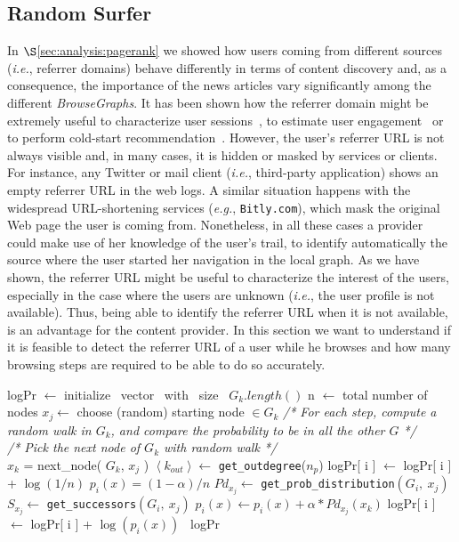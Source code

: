\documentclass{sig-alternate-2013}
\newcommand{\ie}{\emph{i.e.}}
\newcommand{\eg}{\emph{e.g.}}
\newcommand{\bgraphs}{\textit{BrowseGraphs}}
\begin{document}
\subsection{Random Surfer} \label{sec:randomsurfer}
In $\S$\ref{sec:analysis:pagerank} we showed how users coming from different sources (\ie, referrer domains) behave differently in terms of content discovery and, as a consequence, the importance of the news articles vary significantly among the different \bgraphs.
It has been shown how the referrer domain might be extremely useful to characterize user sessions~\cite{chiarandini12discovering}, to estimate user engagement~\cite{lehmann2013measuring} or to perform cold-start recommendation~\cite{TrevisiolRecSys14}.
However, the user's referrer URL is not always visible and, in many cases, it is hidden or masked by services or clients. For instance, any Twitter or mail client (\ie, third-party application) shows an empty referrer URL in the web logs. A similar situation happens with the widespread URL-shortening services (\eg, \texttt{Bitly.com}), which mask the original Web page the user is coming from. Nonetheless, in all these cases a provider could make use of her knowledge of the user's trail, to identify automatically the source where the user started her navigation in the local graph. As we have shown, the referrer URL might be useful to characterize the interest of the users, especially in the case where the users are unknown (\ie, the user profile is not available). Thus, being able to identify the referrer URL when it is not available, is an advantage for the content provider. In this section we want to understand if it is feasible to detect the referrer URL of a user while he browses and how many browsing steps are required to be able to do so accurately. 
% 
\begin{algorithm}[!th]
  logPr $\leftarrow$ initialize ~vector ~with ~size ~$G_k.length()$\;
  n $\leftarrow$ total number of nodes\;
  $x_j \leftarrow$ choose (random) starting node $\in G_k$\;
  \BlankLine
  \emph{/* For each step, compute a random walk in $G_k$, and compare the probability to be in all the other $G$ */}\\
   {
    \BlankLine
    \emph{/* Pick the next node of $G_k$ with random walk */}\\
    $x_k$ = next\_node( $G_k$, $x_j$ )\;
    \BlankLine
     {
      $\left\langle k_{out}\right\rangle \leftarrow$ \texttt{get\_outdegree}($n_p$)\;
       {
        logPr[ i ] $\leftarrow$ logPr[ i ] + $\log( 1 / n )$\;
      }{
        $p_i(x) = (1-\alpha) / n$\;
                  $Pd_{x_j} \leftarrow$ \texttt{get\_prob\_distribution}$(G_i,~x_j)$\;
                  $S_{x_j} \leftarrow$ \texttt{get\_successors}$(G_i,~x_j)$\;
         {
          $p_i(x) \leftarrow p_i(x) + \alpha * Pd_{x_j}(x_k)$\;
        }
        logPr[ i ] $\leftarrow$ logPr[ i ] + $\log( p_i(x) )$\;
      }
    }
  }
  \Return{}~logPr
\caption{\texttt{RandomSurfer}(k,~$\alpha$,~steps,~G)}\label{algo:randomsurfer}
\end{algorithm}
% 
\end{document}
